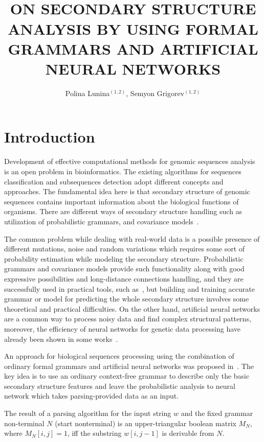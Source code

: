 \documentclass[12pt,a4paper]{cibb}
\title{\large $\ $\\ \bf ON SECONDARY STRUCTURE ANALYSIS BY USING FORMAL GRAMMARS AND ARTIFICIAL NEURAL NETWORKS}
\author{ Polina Lunina$^{(1,2)}$, Semyon Grigorev$^{(1,2)}$}
\begin{document}
\thispagestyle{myheadings}
\pagestyle{myheadings}



\section{\bf Introduction}

Development of effective computational methods for genomic sequences analysis is an open problem in bioinformatics.
The existing algorithms for sequences classification and subsequences detection adopt different concepts and approaches.
The fundamental idea here is that secondary structure of genomic sequences contains important information about the biological functions of organisms.
There are different ways of secondary structure handling such as utilization of probabilistic grammars, and covariance models~\cite{EddyDurbin, dowell2004evaluation, knudsen1999rna}.

The common problem while dealing with real-world data is a possible presence of different mutations, noise and random variations which requires some sort of probability estimation while modeling the secondary structure.
Probabilistic grammars and covariance models provide such functionality along with good expressive possibilities and long-distance connections handling, and they are successfully used in practical tools, such as~\cite{Infernal}, but building and training accurate grammar or model for predicting the whole secondary structure involves some theoretical and practical difficulties.
On the other hand, artificial neural networks are a common way to process noisy data and find complex structural patterns, moreover, the efficiency of neural networks for genetic data processing have already been shown in some works~\cite{Humidor,ANN}.

An approach for biological sequences processing using the combination of ordinary formal grammars and artificial neural networks was proposed in~\cite{grigorevcomposition}.
The key idea is to use an ordinary context-free grammar to describe only the basic secondary structure features and leave the probabilistic analysis to neural network which takes parsing-provided data as an input.

The result of a parsing algorithm for the input string $w$ and the fixed grammar non-terminal $N$ (start nonterminal) is an upper-triangular boolean matrix $M_N$, where $M_N [i,j] = 1$, iff the substring $w[i,j-1]$ is derivable from $N$.
\end{document}

